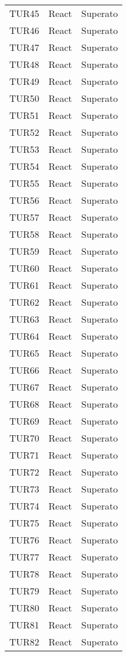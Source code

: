 \documentclass[PianoDiQualifica.tex]{subfiles}
\begin{document}
\begin{longtable}[H]{P{2cm}P{8.5cm}P{3cm}}
	TUR45 & React & Superato \\ 
	TUR46 & React & Superato \\ 
	TUR47 & React & Superato \\ 
	TUR48 & React & Superato \\ 
	TUR49 & React & Superato \\ 
	TUR50 & React & Superato \\ 
	TUR51 & React & Superato \\ 
	TUR52 & React & Superato \\ 
	TUR53 & React & Superato \\ 
	TUR54 & React & Superato \\ 
	TUR55 & React & Superato \\ 
	TUR56 & React & Superato \\ 
	TUR57 & React & Superato \\ 
	TUR58 & React & Superato \\ 
	TUR59 & React & Superato \\ 
	TUR60 & React & Superato \\ 
	TUR61 & React & Superato \\ 
	TUR62 & React & Superato \\ 
	TUR63 & React & Superato \\ 
	TUR64 & React & Superato \\ 
	TUR65 & React & Superato \\ 
	TUR66 & React & Superato \\ 
	TUR67 & React & Superato \\ 
	TUR68 & React & Superato \\ 
	TUR69 & React & Superato \\ 
	TUR70 & React & Superato \\ 
	TUR71 & React & Superato \\ 
	TUR72 & React & Superato \\ 
	TUR73 & React & Superato \\ 
	TUR74 & React & Superato \\ 
	TUR75 & React & Superato \\ 
	TUR76 & React & Superato \\ 
	TUR77 & React & Superato \\ 
	TUR78 & React & Superato \\ 
	TUR79 & React & Superato \\ 
	TUR80 & React & Superato \\ 
	TUR81 & React & Superato \\ 
	TUR82 & React & Superato \\ 

\end{longtable}
\end{document}
